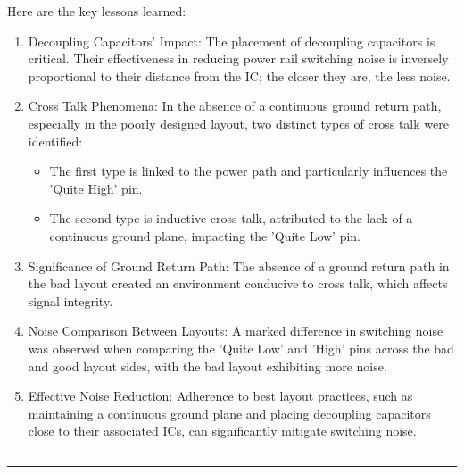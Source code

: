 \documentclass[a4paper,11pt]{article}%
\begin{document}
Here are the key lessons learned:\\
\begin{enumerate}
	\item Decoupling Capacitors' Impact: The placement of decoupling capacitors is critical. Their effectiveness in reducing power rail switching noise is inversely proportional to their distance from the IC; the closer they are, the less noise.
	\item Cross Talk Phenomena: In the absence of a continuous ground return path, especially in the poorly designed layout, two distinct types of cross talk were identified:
	\begin{itemize}
		\item 
		The first type is linked to the power path and particularly influences the 'Quite High' pin.
		\item The second type is inductive cross talk, attributed to the lack of a continuous ground plane, impacting the 'Quite Low' pin.
	\end{itemize}
	\item Significance of Ground Return Path: The absence of a ground return path in the bad layout created an environment conducive to cross talk, which affects signal integrity.
	\item 
	Noise Comparison Between Layouts: A marked difference in switching noise was observed when comparing the 'Quite Low' and 'High' pins across the bad and good layout sides, with the bad layout exhibiting more noise.
	\item Effective Noise Reduction: Adherence to best layout practices, such as maintaining a continuous ground plane and placing decoupling capacitors close to their associated ICs, can significantly mitigate switching noise.
\end{enumerate}











\vfill
\hrule
\vspace{0.5cm}



\vspace{1cm}
\hrule
\vspace{0.5cm}


\end{document}
